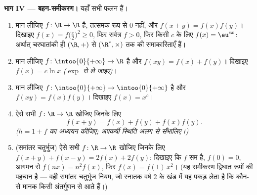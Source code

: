 \begin{problem}[{सप्ताहांत समस्या --- $f(x + y) = f(x) + f(y)$: नियमितता रैखिकता पर बाध्य कर देती है, और राक्षसों
का चित्र}]
\medskip \noindent\textbf{भाग IV --- बहन-समीकरण।} यहाँ सभी फलन  हैं।
\begin{enumerate}[resume]
  \item मान लीजिए $f \colon \R \to \R$  है, तत्समक रूप से $0$ नहीं, और
  $f(x + y) = f(x)f(y)$। दिखाइए $f(x) = f\bigl(\frac x2\bigr)^2 \geq 0$, फिर
  सर्वत्र $f > 0$, फिर किसी $c$ के लिए $f(x) = \eu^{cx}$: अर्थात् चरघातांकी
  ही $(\R, +)$ से $(\R^*, \times)$ तक की  समाकारिताएँ हैं।
  \item मान लीजिए $f \colon \intoo{0}{+\infty} \to \R$  है और $f(xy) =
  f(x) + f(y)$। दिखाइए $f(x) = c\ln x$ \emph{($\exp$ से ले जाइए)}।
  \item मान लीजिए $f \colon \intoo{0}{+\infty} \to \intoo{0}{+\infty}$ 
  है और $f(xy) = f(x)f(y)$। दिखाइए $f(x) = x^c$।
  \item ऐसे सभी  $f \colon \R \to \R$ खोजिए जिनके लिए
        \[
        f(x + y) = f(x) + f(y) + f(x)f(y) .
        \]
        \emph{($h = 1 + f$ का अध्ययन कीजिए; अपकर्षी स्थिति अलग से सँभालिए।)}
  \item (समांतर चतुर्भुज) ऐसे सभी  $f \colon \R \to \R$ खोजिए जिनके लिए
  $f(x + y) + f(x - y) = 2f(x) + 2f(y)$: दिखाइए कि $f$ सम है, $f(0) = 0$,
  आगमन से $f(nx) = n^2 f(x)$, फिर $f(x) = f(1)\,x^2$। (यह समीकरण द्विघात
  रूपों की पहचान है --- वही समांतर चतुर्भुज नियम, जो स्नातक वर्ष 2 के खंड
  में यह पकड़ लेता है कि कौन-से मानक किसी अंतर्गुणन से आते हैं।)
\end{enumerate}


\end{problem}
